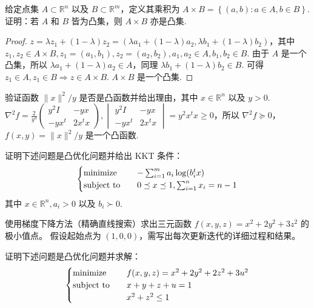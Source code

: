 \begin{problem}[问答]
    给定点集 $A\subset \mathbb{R}^n$ 以及 $B \subset \mathbb{R}^m$，定义其乘积为 $A \times B = \left\{(a, b): a \in A, b \in B\right\}$.证明：若 $A$ 和 $B$ 皆为凸集，则 $A \times B$ 亦是凸集.
    \begin{proof}
        $z = \lambda z_1 + (1 - \lambda)z_2 = (\lambda a_1 + (1 - \lambda)a_2, \lambda b_1 + (1 - \lambda)b_2)$，其中 $z_1, z_2 \in A \times B, z_1 = (a_1, b_1), z_2 = (a_2, b_2), a_1, a_2 \in A, b_1, b_2 \in B$. 由于 $A$ 是一个凸集，所以 $\lambda a_1 + (1 - \lambda)a_2 \in A$，同理 $\lambda b_1 + (1 - \lambda)b_2 \in B$. 可得 $z_1 \in A, z_1 \in B \Longrightarrow z \in A\times B$. $A \times B$ 是一个凸集.
    \end{proof}
\end{problem}

\begin{problem}[问答]
    验证函数 $\|x\|^2 / y$ 是否是凸函数并给出理由，其中 $x \in \mathbb{R}^n$ 以及 $y > 0$.
    \Answer $\nabla^2f = \frac{2}{y^3}\begin{pmatrix}
        y^2I & -yx \\
        -yx^t & 2x^tx
    \end{pmatrix}, \begin{vmatrix}
        y^2I & -yx \\
        -yx^t & 2x^tx
    \end{vmatrix} = y^2x^tx \ge 0$，所以 $\nabla^2f \succeq 0$，$f(x, y) = \|x\|^2 / y$ 是一个凸函数.
\end{problem}

\begin{problem}[问答]
    证明下述问题是凸优化问题并给出 KKT 条件：\[\begin{cases}
        \operatorname{minimize} \quad &-\sum_{i = 1}^m a_i\log(b_i^tx)\\
        \operatorname{subject\ to} \quad &0 \preceq x \preceq 1, \sum_{i = 1}^nx_i = n - 1
    \end{cases}\] 其中 $x\in \mathbb{R}^n, a_i > 0$ 以及 $b_i \succ 0$.
    \Answer 
\end{problem}

\begin{problem}[问答]
    使用梯度下降方法（精确直线搜索）求出三元函数 $f(x, y, z) = x^2 + 2y^2 + 3z^2$ 的极小值点。 假设起始点为 $(1, 0, 0)$，需写出每次更新迭代的详细过程和结果。
    \Answer 
\end{problem}

\begin{problem}[问答]
    证明下述问题是凸优化问题并求解：\[\begin{cases}
        \operatorname{minimize} \quad &f(x, y, z) = x^2 + 2y^2 + 2z^2 + 3u^2\\
        \operatorname{subject\ to} \quad &x + y + z + u = 1\\
        &x^2 + z^2 \le 1 
    \end{cases}\]
    \Answer 
\end{problem}

